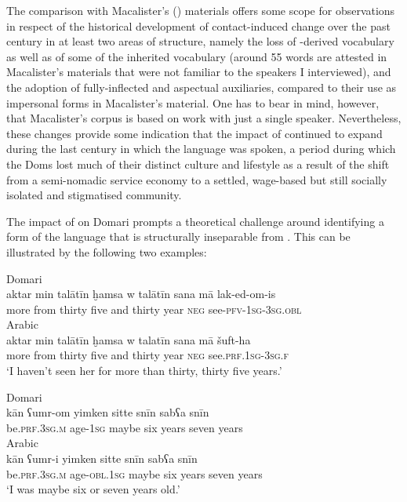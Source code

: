 \documentclass[output=paper]{langsci/langscibook}
\begin{document}
The comparison with Macalister's (\citeyear{Macalister1914}) materials offers some scope for observations in respect of the historical development of contact-induced change over the past century in at least two areas of structure, namely the loss of -derived vocabulary as well as of some of the inherited  vocabulary (around 55 words are attested in Macalister’s materials that were not familiar to the speakers I interviewed), and the adoption of fully-inflected  and aspectual auxiliaries, compared to their use as impersonal forms in Macalister’s material. One has to bear in mind, however, that Macalister’s corpus is based on work with just a single speaker. Nevertheless, these changes provide some indication that the impact of  continued to expand during the last century in which the language was spoken, a period during which the Doms lost much of their distinct culture and lifestyle as a result of the shift from a semi-nomadic service economy to a settled, wage-based but still socially isolated and stigmatised community. 

The impact of  on Domari prompts a theoretical challenge around identifying a form of the language that is structurally inseparable from . This can be illustrated by the following two examples:

\ea \label{aktar1}
\ea
{Domari}\\
\gll aktar min talātīn ḫamsa w talātīn sana mā lak-ed-om-is\\
     more from thirty five and thirty year \textsc{neg} see-\textsc{pfv-1sg-3sg.obl}\\ \label{aktar}
\ex
{Arabic}\\
\gll aktar min talātīn ḫamsa w talatīn sana mā šuft-ha\\
     more from thirty five and thirty year \textsc{neg} see.\textsc{prf.1sg-3sg.f}\\ \label{aktar2}
\glt ‘I haven’t seen her for more than thirty, thirty five years.’
\z
\z

\ea \label{umr1}
\ea
{Domari}\\
\gll kān ʕumr-om yimken sitte snīn sabʕa snīn\\
     be\textsc{.prf.3sg.m} age-\textsc{1sg} maybe six years seven years\\ \label{umr}
\ex
{Arabic}\\
\gll kān ʕumr-i yimken sitte snīn sabʕa snīn\\
     be\textsc{.prf.3sg.m} age-\textsc{obl.1sg} maybe six years seven years\\ \label{umr2}
\glt ‘I was maybe six or seven years old.’
\z
\z
\end{document}
